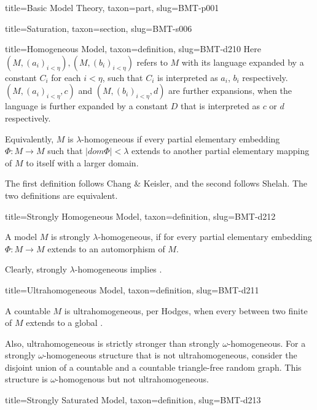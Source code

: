 \documentclass[a4paper]{article}
\begin{document}
\begin{tree}{title={Basic Model Theory}, taxon={part}, slug={BMT-p001}}
\begin{tree}{title={Saturation}, taxon={section}, slug={BMT-s006}}
\begin{tree}{title={Homogeneous Model}, taxon={definition}, slug={BMT-d210}}
    Here \((M,(a_i)_{i< \eta }),(M,(b_i)_{i< \eta })\) refers to \(M\) with its language expanded by a constant \(C_i\) for each \(i< \eta\), such that \(C_i\) is interpreted as \(a_i\), \(b_i\) respectively. 
    \((M,(a_i)_{i< \eta },c)\) and \((M,(b_i)_{i< \eta },d)\) are further expansions, when the language is further expanded by a constant \(D\) that is interpreted as \(c\) or \(d\) respectively.

    Equivalently, \(M\) is \(\lambda\)-homogeneous if every partial elementary embedding \(\Phi :M \to  M\) such that \(|dom \Phi |< \lambda\) extends to another partial elementary mapping of \(M\) to itself with a larger domain.

    The first definition follows Chang & Keisler, and the second follows Shelah. The two definitions are equivalent.

\end{tree}

\begin{tree}{title={Strongly Homogeneous Model}, taxon={definition}, slug={BMT-d212}}

    A model \(M\) is strongly \(\lambda\)-homogeneous, if for every partial elementary embedding \(\Phi :M \to  M\) extends to an automorphism of \(M\). 

    Clearly, strongly \(\lambda\)-homogeneous implies . 

\end{tree}

\begin{tree}{title={Ultrahomogeneous Model}, taxon={definition}, slug={BMT-d211}}

    A countable  \(M\) is ultrahomogeneous, per Hodges, when every  between two finite  of \(M\) extends to a global .

    Also, ultrahomogeneous is strictly stronger than strongly \(\omega\)-homogeneous. For a strongly \(\omega\)-homogeneous structure that is not ultrahomogeneous, consider the disjoint union of a countable  and a countable triangle-free random graph. This structure is \(\omega\)-homogenous but not ultrahomogeneous.

\end{tree}

\begin{tree}{title={Strongly Saturated Model}, taxon={definition}, slug={BMT-d213}}
{



}
\end{tree}
\end{tree}
\end{tree}
\end{document}
